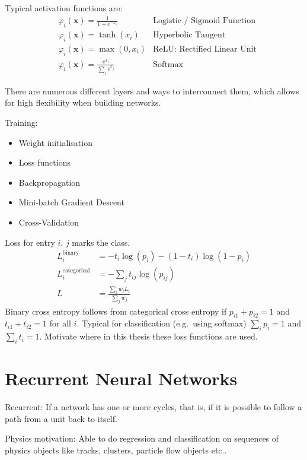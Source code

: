 Typical activation functions are:
\begin{align*}
  &\varphi_i(\mathbf{x}) = \frac{1}{1 + e^{-x_i}} &\text{Logistic / Sigmoid Function} \\
  &\varphi_i(\mathbf{x}) = \tanh(x_i) &\text{Hyperbolic Tangent} \\
  &\varphi_i(\mathbf{x}) = \max(0, x_i) &\text{ReLU: Rectified Linear Unit} \\
  &\varphi_i(\mathbf{x}) = \frac{e^{x_i}}{\sum_j e^{x_j}}&\text{Softmax}
\end{align*}
\cite{theano}

There are numerous different layers and ways to interconnect them, which allows
for high flexibility when building networks.

Training:
\begin{itemize}
\item Weight initialisation
\item Loss functions
\item Backpropagation \cite{lecun-backprop}
\item Mini-batch Gradient Descent
\item Cross-Validation
\end{itemize}

Loss for entry $i$. $j$ marks the class.
\begin{align*}
  L_i^\mathrm{binary} &= -t_i \log(p_i) - (1 - t_i) \log(1 - p_i) \\
  L_i^\mathrm{categorical} &= - \sum_j t_{ij} \log(p_{ij}) \\
  L &= \frac{\sum_i w_i L_i}{\sum_j w_j}
\end{align*}
Binary cross entropy follows from categorical cross entropy if
$p_{i1} + p_{i2} = 1$ and $t_{i1} + t_{i2} = 1$ for all $i$. Typical for
classification (e.g.\ using softmax) $\sum_i p_i = 1$ and $\sum_i t_i = 1$.
Motivate where in this thesis these loss functions are used.

\section{Recurrent Neural Networks}
\label{sec:rnn}

Recurrent: If a network has one or more cycles, that is, if it is possible to
follow a path from a unit back to itself.

Physics motivation: Able to do regression and classification on sequences of
physics objects like tracks, clusters, particle flow objects etc..


